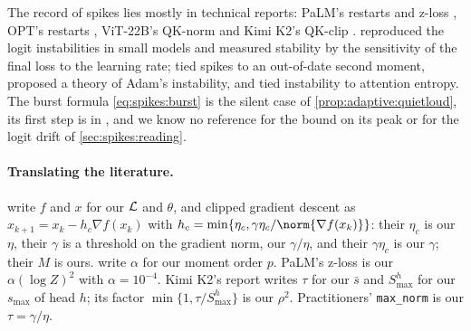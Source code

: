 \begin{refsection}
The record of spikes lies mostly in technical reports: PaLM's restarts and z-loss \parencite{ChowdheryEtAl2023}, OPT's restarts \parencite{ZhangEtAl2022OPT}, ViT-22B's QK-norm \parencite{DehghaniEtAl2023} and Kimi K2's QK-clip \parencite{KimiTeam2025}. \Textcite{WortsmanEtAl2024} reproduced the logit instabilities in small models and measured stability by the sensitivity of the final loss to the learning rate; \textcite{WortsmanEtAl2023} tied spikes to an out-of-date second moment, \textcite{MolybogEtAl2023} proposed a theory of Adam's instability, and \textcite{ZhaiEtAl2023} tied instability to attention entropy. The burst formula \eqref{eq:spikes:burst} is the silent case of \cref{prop:adaptive:quietloud}, its first step is in \textcite{KingmaBa2015}, and we know no reference for the bound on its peak or for the logit drift of \cref{sec:spikes:reading}.

\paragraph{Translating the literature.} \Textcite{ZhangHeSraJadbabaie2020} write $f$ and $x$ for our $\mathcal{L}$ and $\theta$, and clipped gradient descent as $x_{k+1}=x_k-h_c\nabla f(x_k)$ with $h_c=\min\{\eta_c,\gamma\eta_c/\norm{\nabla f(x_k)}\}$: their $\eta_c$ is our $\eta$, their $\gamma$ is a threshold on the gradient norm, our $\gamma/\eta$, and their $\gamma\eta_c$ is our $\gamma$; their $M$ is ours. \Textcite{ZhangEtAl2020Attention} write $\alpha$ for our moment order $p$. PaLM's z-loss is our $\alpha(\log Z)^2$ with $\alpha=10^{-4}$. Kimi K2's report writes $\tau$ for our $\bar s$ and $S^h_{\max}$ for our $s_{\max}$ of head $h$; its factor $\min\{1,\tau/S^h_{\max}\}$ is our $\rho^2$. Practitioners' \texttt{max\_norm} is our $\tau=\gamma/\eta$.

\printchapterbib
\end{refsection}
